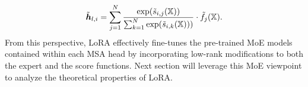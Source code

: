 \begin{align}
\tilde{{\bm h}}_{l, i}
= \sum_{j = 1}^N  
    \frac{\exp(\tilde{s}_{i, j}(\mathbb{X}))}
    {
        \sum_{k = 1}^N \exp(\tilde{s}_{i, k}(\mathbb{X}))) 
    } \cdot \tilde{f}_j(\mathbb{X}). \label{eq:LORA_MoE}
\end{align}
From this perspective, LoRA effectively fine-tunes the pre-trained MoE models contained within each MSA head by incorporating low-rank modifications to both the expert and the score functions. Next section will leverage this MoE viewpoint to analyze the theoretical properties of LoRA.



